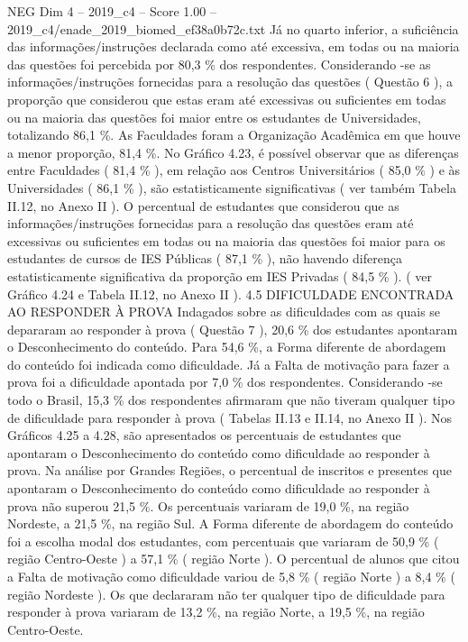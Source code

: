\begin{textsample}{NEG Dim 4 – 2019\_c4 – Score 1.00 – 2019\_c4/enade\_2019\_biomed\_ef38a0b72c.txt}
Já no quarto inferior, a suficiência das informações/instruções declarada como até excessiva, em todas ou na maioria das questões foi percebida por 80,3 \% dos respondentes.
Considerando -se as informações/instruções fornecidas para a resolução das questões ( Questão 6 ), a proporção que considerou que estas eram até excessivas ou suficientes em todas ou na maioria das questões foi maior entre os estudantes de Universidades, totalizando 86,1 \%.
As Faculdades foram a Organização Acadêmica em que houve a menor proporção, 81,4 \%.
No Gráfico 4.23, é possível observar que as diferenças entre Faculdades ( 81,4 \% ), em relação aos Centros Universitários ( 85,0 \% ) e às Universidades ( 86,1 \% ), são estatisticamente significativas ( ver também Tabela II.12, no Anexo II ).
O percentual de estudantes que considerou que as informações/instruções fornecidas para a resolução das questões eram até excessivas ou suficientes em todas ou na maioria das questões foi maior para os estudantes de cursos de IES Públicas ( 87,1 \% ), não havendo diferença estatisticamente significativa da proporção em IES Privadas ( 84,5 \% ). ( ver Gráfico 4.24 e Tabela II.12, no Anexo II ). 4.5 DIFICULDADE ENCONTRADA AO RESPONDER À PROVA Indagados sobre as dificuldades com as quais se depararam ao responder à prova ( Questão 7 ), 20,6 \% dos estudantes apontaram o Desconhecimento do conteúdo.
Para 54,6 \%, a Forma diferente de abordagem do conteúdo foi indicada como dificuldade.
Já a Falta de motivação para fazer a prova foi a dificuldade apontada por 7,0 \% dos respondentes.
Considerando -se todo o Brasil, 15,3 \% dos respondentes afirmaram que não tiveram qualquer tipo de dificuldade para responder à prova ( Tabelas II.13 e II.14, no Anexo II ).
Nos Gráficos 4.25 a 4.28, são apresentados os percentuais de estudantes que apontaram o Desconhecimento do conteúdo como dificuldade ao responder à prova.
Na análise por Grandes Regiões, o percentual de inscritos e presentes que apontaram o Desconhecimento do conteúdo como dificuldade ao responder à prova não superou 21,5 \%.
Os percentuais variaram de 19,0 \%, na região Nordeste, a 21,5 \%, na região Sul.
A Forma diferente de abordagem do conteúdo foi a escolha modal dos estudantes, com percentuais que variaram de 50,9 \% ( região Centro-Oeste ) a 57,1 \% ( região Norte ).
O percentual de alunos que citou a Falta de motivação como dificuldade variou de 5,8 \% ( região Norte ) a 8,4 \% ( região Nordeste ).
Os que declararam não ter qualquer tipo de dificuldade para responder à prova variaram de 13,2 \%, na região Norte, a 19,5 \%, na região Centro-Oeste.

\end{textsample}
